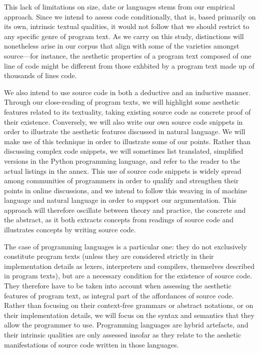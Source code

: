 This lack of limitations on size, date or languages stems from our empirical approach. Since we intend to assess code conditionally, that is, based primarily on its own, intrinsic textual qualities, it would not follow that we should restrict to any specific genre of program text. As we carry on this study, distinctions will nonetheless arise in our corpus that align with some of the varieties amongst source—for instance, the aesthetic properties of a program text composed of one line of code might be different from those exhbited by a program text made up of thousands of lines code.

We also intend to use source code in both a deductive and an inductive manner. Through our close-reading of program texts, we will highlight some aesthetic features related to its textuality, taking existing source code as concrete proof of their existence. Conversely, we will also write our own source code snippets in order to illustrate the aesthetic features discussed in natural language. We will make use of this technique in order to illustrate some of our points. Rather than discussing complex code snippets, we will sometimes list translated, simplified versions in the Python programming language, and refer to the reader to the actual listings in the annex. This use of source code snippets is widely spread among communities of programmers in order to qualify and strengthen their points in online discussions, and we intend to follow this weaving in of machine language and natural language in order to support our argumentation. This approach will therefore oscillate between theory and practice, the concrete and the abstract, as it both extracts concepts from readings of source code and illustrates concepts by writing source code.

The case of programming languages is a particular one: they do not exclusively constitute program texts (unless they are considered strictly in their implementation details as lexers, interpreters and compilers, themselves described in program texts), but are a necessary condition for the existence of source code. They therefore have to be taken into account when assessing the aesthetic features of program text, as integral part of the affordances of source code. Rather than focusing on their context-free grammars or abstract notations, or on their implementation details, we will focus on the syntax and semantics that they allow the programmer to use. Programming languages are hybrid artefacts, and their intrinsic qualities are only assessed insofar as they relate to the aeshetic manifestations of source code written in those languages.

